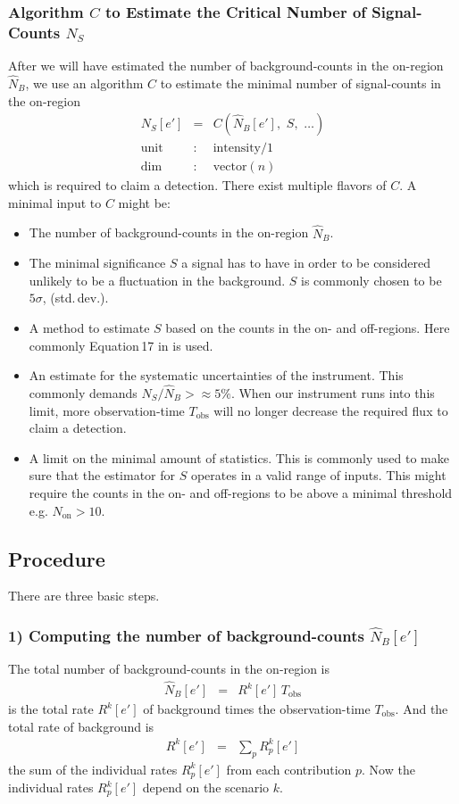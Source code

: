 \documentclass{article}%
\begin{document}
\subsubsection*{Algorithm $C$ to Estimate the Critical Number of Signal-Counts $N_S$}
%
After we will have estimated the number of background-counts in the on-region $\hat{N}_B$, we use an algorithm $C$ to estimate the minimal number of signal-counts in the on-region
%
\begin{eqnarray*}
N_S[e'] &=& C(\hat{N}_B[e'],\,\,S,\,\,\dots)\\
\text{unit} &:& \text{intensity}/1\\
\text{dim} &:& \text{vector}(n)
\end{eqnarray*}
%
which is required to claim a detection.
%
There exist multiple flavors of $C$.
%
A minimal input to $C$ might be:
%
\begin{itemize}
%
\item{} The number of background-counts in the on-region $\hat{N}_B$.
%
\item{} The minimal significance $S$ a signal has to have in order to be considered unlikely to be a fluctuation in the background.
%
$S$ is commonly chosen to be $5\sigma$, (std.\,dev.).
%
\item{} A method to estimate $S$ based on the counts in the on- and off-regions. Here commonly Equation\,17 in \cite{li1983analysis} is used.
%
\item{} An estimate for the systematic uncertainties of the instrument. This commonly demands $N_S/\hat{N}_B >\approx 5\%$.
%
When our instrument runs into this limit, more observation-time $T_\text{obs}$ will no longer decrease the required flux to claim a detection.
%
\item{}
A limit on the minimal amount of statistics. This is commonly used to make sure that the estimator for $S$ operates in a valid range of inputs.
%
This might require the counts in the on- and off-regions to be above a minimal threshold e.g. $N_\text{on} > 10$.
%
\end{itemize}
%
\subsection{Procedure}
\label{SubSecProcedure}
%
There are three basic steps.
%
\subsubsection*{1) Computing the number of background-counts $\hat{N}_B[e']$}
%
The total number of background-counts in the on-region is
%
\begin{eqnarray}
\hat{N}_B[e'] &=& R^k[e'] \, T_\text{obs}
\end{eqnarray}
%
is the total rate $R^k[e']$ of background times the observation-time $T_\text{obs}$.
%
And the total rate of background is
%
\begin{eqnarray}
R^k[e'] &=& \sum_{p} R^k_p[e']
\end{eqnarray}
%
the sum of the individual rates $R^k_p[e']$ from each contribution $p$.
%
Now the individual rates $R^k_p[e']$ depend on the scenario $k$.
%
\end{document}

